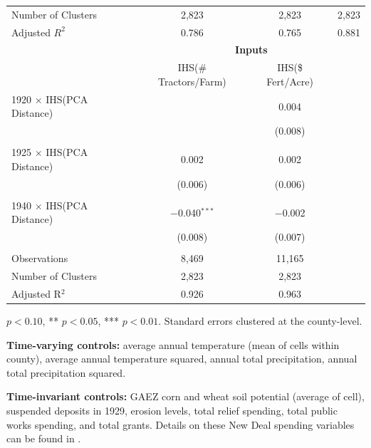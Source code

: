 \documentclass[12pt]{article}
\begin{document}
\begin{table}
\begin{threeparttable}[t]
\begin{tabular}{l*{3}{c}}
Number of Clusters &2,823 &2,823 &2,823 \\
Adjusted $R^{2}$                          & 0.786 & 0.765 & 0.881                   \\
\hline\hline
& \multicolumn{3}{c}{\textbf{Inputs}} \\
&\multicolumn{1}{c}{IHS(\# Tractors/Farm)} &           \multicolumn{1}{c}{IHS(\$ Fert/Acre)} & \\ \hline
1920 $\times$ IHS(PCA Distance)&                 & 0.004   & \\
                               &                 & (0.008) & \\
                               &                 &         & \\
1925 $\times$ IHS(PCA Distance)& 0.002           & 0.002   & \\
                               & (0.006)         & (0.006) & \\
                               &                 &         & \\
1940 $\times$ IHS(PCA Distance)& $-$0.040$^{***}$& $-$0.002& \\
                               & (0.008)         & (0.007) & \\
                               &                 &         & \\
                               \hline
Observations &  8,469 & 11,165 &  \\ 
Number of Clusters &2,823 &2,823 & \\
Adjusted R$^{2}$  & 0.926 & 0.963 & \\ 
\hline
\end{tabular}
    \begin{tablenotes}
        \item {\footnotesize * \(p<0.10\), ** \(p<0.05\), *** \(p<0.01\). Standard errors clustered at the county-level.}
        \item{\footnotesize \textbf{Time-varying controls:} average annual temperature (mean of cells within county), average annual temperature squared, annual total precipitation, annual total precipitation squared.}
        \item {\footnotesize \textbf{Time-invariant controls:} GAEZ corn and wheat soil potential (average of cell), suspended deposits in 1929, erosion levels, total relief spending, total public works spending, and total grants. Details on these New Deal spending variables can be found in \citet{fishback_can_2003}.}

\end{tablenotes}
\end{threeparttable}
\end{table}
\end{document}
